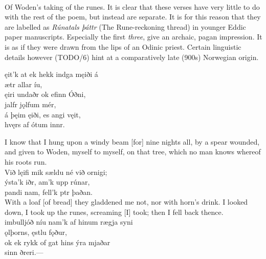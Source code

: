  \\

Of Woden's taking of the runes.
It is clear that these verses have very little to do with the rest of the poem, but instead are separate. It is for this reason that they are labelled as \emph{Rúnatals þáttr} (The Rune-reckoning thread) in younger Eddic paper manuscripts. Especially the first \emph{three}, give an archaic, pagan impression. It is as if they were drawn from the lips of an Odinic priest. Certain linguistic details however (TODO/6) hint at a comparatively late (900s) Norwegian origin.

\bva \footnotemark[2] ęit'k at ek hekk \hld {}indga męiði á \\%
\ind {}ætr allar íu, \\%
ęiri undaðr \hld ok efinn Óðni, \\%
\ind {}jalfr jǫlfum mér, \\%
á þęim ęiði, \hld es angi vęit, \\%
\ind hvęrs af ótum innr\footnotemark[3].\\%

\bvb I know that I hung upon a windy beam [for] nine nights all, by a spear wounded, and given to Woden, myself to myself, on that tree, which no man knows whereof his roots run. \\

\bva Við lęifi mik sældu \hld né við ornigi; \\%
ýsta'k iðr, \hld {}am'k upp rúnar, \\%
pandi nam, \hld fell'k ptr þaðan.\\%

\bvb With a loaf [of bread] they gladdened me not, nor with horn's drink. I looked down, I took up the runes, screaming [I] took; then I fell back thence. \\

\bva {}imbulljóð níu \hld nam'k af hinum rægja syni \\%
\ind {}ǫlþorns, ęstlu fǫður, \\%
ok ek rykk of gat \hld hins ýra mjaðar \\%
\ind {}sinn ðreri.\footnotemark[1] —\\%


